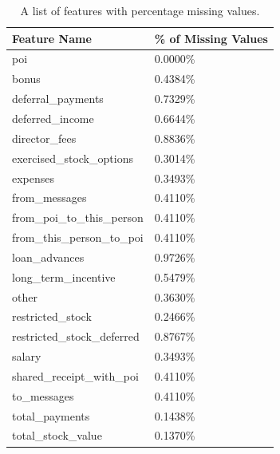 \documentclass[titlepage,numbers=noenddot,headinclude,%
               footinclude=true,abstractoff,BCOR=5mm,%
               paper=a4,fontsize=11pt,ngerman,american]{scrreprt}
\numberwithin{theorem}{chapter}
\numberwithin{definition}{chapter}
\numberwithin{algorithm}{chapter}
\numberwithin{figure}{chapter}
\numberwithin{table}{chapter}
\numberwithin{equation}{chapter}
\begin{document}
\begin{table}[!htbp]
  \begin{center}
  \caption{A list of features with percentage missing values.}
    \begin{tabular}{ |p{5cm}|p{3cm}| }
    \hline
    Feature Name &  \% of \textbf{Missing} Values\\[1ex]

    \hline
    poi                            & 0.0000\% \\
    bonus                          & 0.4384\% \\
    deferral\_payments              & 0.7329\% \\
    deferred\_income                & 0.6644\% \\
    director\_fees                  & 0.8836\% \\
    exercised\_stock\_options        & 0.3014\% \\
    expenses                       & 0.3493\% \\
    from\_messages                  & 0.4110\% \\
    from\_poi\_to\_this\_person        & 0.4110\% \\
    from\_this\_person\_to\_poi        & 0.4110\% \\
    loan\_advances                  & 0.9726\% \\
    long\_term\_incentive            & 0.5479\% \\
    other                          & 0.3630\% \\
    restricted\_stock               & 0.2466\% \\
    restricted\_stock\_deferred      & 0.8767\% \\
    salary                         & 0.3493\% \\
    shared\_receipt\_with\_poi        & 0.4110\% \\
    to\_messages                    & 0.4110\% \\
    total\_payments                 & 0.1438\% \\
    total\_stock\_value              & 0.1370\% \\
    \hline
    \end{tabular}
    \label{tableFeatureMissing}
  \end{center}
\end{table}
\end{document}
